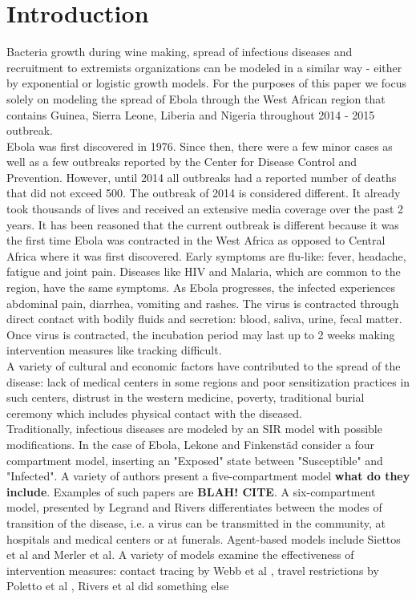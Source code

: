 \documentclass[10pt]{article}
\begin{document}
\section{Introduction}
Bacteria growth during wine making, spread of infectious diseases and recruitment to extremists organizations can be modeled in a similar way - either by exponential or logistic growth models. For the purposes of this paper we focus solely on modeling the spread of Ebola through the West African region that contains Guinea, Sierra Leone, Liberia and Nigeria throughout 2014 - 2015 outbreak. \\
%
%
%
Ebola was first discovered in 1976. Since then, there were a few minor cases as well as a few outbreaks reported by the Center for Disease Control and Prevention. However, until 2014 all outbreaks had a reported number of deaths that did not exceed 500. The outbreak of 2014 is considered different. It already took thousands of lives and received an extensive media coverage over the past 2 years.
%
%
%
It has been reasoned that the current outbreak is different because it was the first time Ebola was contracted in the West Africa as opposed to Central Africa where it was first discovered. Early symptoms are flu-like: fever, headache, fatigue and joint pain. Diseases like HIV and Malaria, which are common to the region, have the same symptoms. As Ebola progresses, the infected experiences abdominal pain, diarrhea, vomiting and rashes. The virus is contracted through direct contact with bodily fluids and secretion: blood, saliva, urine, fecal matter. Once virus is contracted, the incubation period may last up to 2 weeks making intervention measures like tracking difficult. 
%
%
%
\\A variety of cultural and economic factors have contributed to the spread of the disease: lack of medical centers in some regions and poor sensitization practices in such centers, distrust in the western medicine, poverty, traditional burial ceremony which includes physical contact with the diseased. \\
%
%
%
Traditionally, infectious diseases are modeled by an SIR model with possible modifications. In the case of Ebola, Lekone and Finkenstäd \cite{Lekone2006} consider a four compartment model, inserting an "Exposed" state between "Susceptible" and "Infected". A variety of authors present a five-compartment model \textbf{what do they include}. Examples of such papers are \textbf{BLAH! CITE}. A six-compartment model, presented by Legrand \cite{Legrand2007} and Rivers\cite{Rivers2014} differentiates between the modes of transition of the disease, i.e. a virus can be transmitted in the community, at hospitals and medical centers or at funerals. Agent-based models include Siettos et al \cite{Siettos2015} and Merler et al\cite{Merler2015}. A variety of models examine the effectiveness of intervention measures: contact tracing by Webb et al \cite{Webb2015}, travel restrictions by Poletto et al \cite{Poletto2014},     Rivers et al did something else \cite{Rivers2014}\\\\
\end{document}
